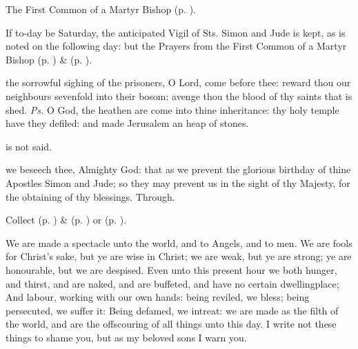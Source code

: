 
\begin{rubric}
	The First Common of a Martyr Bishop (p. \pageref{CommonMartyrBishopI}).
\end{rubric}

\begin{rubric}
	If to-day be Saturday, the anticipated Vigil of Sts. Simon and Jude is kept, as is noted on the following day: but the  Prayers  from the First Common of a Martyr Bishop (p. \pageref{CommonMartyrBishopI}) \&   (p. \pageref{SPMaryInEaster}).
\end{rubric}



\introit
{} the sorrowful sighing of the prisoners, O Lord, come before thee: reward thou our neighbours sevenfold into their bosom: avenge thou the blood of thy saints that is shed. \textit{Ps.} O God, the heathen are come into thine inheritance: thy holy temple have they defiled: and made Jerusalem an heap of stones.

\begin{rubric}
	 is not said.
\end{rubric}

\collect
{} we beseech thee, Almighty God: that as we prevent the glorious birthday of thine Apostles Simon and Jude; so they may prevent us in the sight of thy Majesty, for the obtaining of thy blessings. Through.

\begin{rubric}
	 Collect  (p. \pageref{SPMaryInEaster}) \&   (p. \pageref{SPAgainst}) or  (p. \pageref{SPChiefBishop}).
\end{rubric}

 We are made a spectacle unto the world, and to Angels, and to men. We are fools for Christ's sake, but ye are wise in Christ; we are weak, but ye are strong; ye are honourable, but we are despised. Even unto this present hour we both hunger, and thirst, and are naked, and are buffeted, and have no certain dwellingplace; And labour, working with our own hands: being reviled, we bless; being persecuted, we suffer it: Being defamed, we intreat: we are made as the filth of the world, and are the offscouring of all things unto this day. I write not these things to shame you, but as my beloved sons I warn you.


